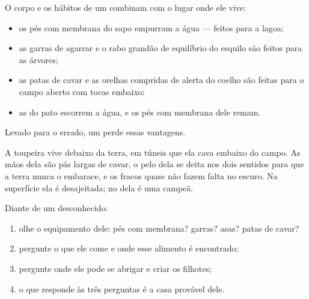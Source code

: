 \begin{proposition}\label{prop:g2:where-animals-live:fit}
O corpo e os hábitos de um  combinam com o lugar onde ele vive:
\begin{itemize}
  \item os pés com membrana do sapo empurram a água --- feitos para
        a lagoa;
  \item as garras de agarrar e o rabo grandão de equilíbrio do
        esquilo são feitos para as árvores;
  \item as patas de cavar e as orelhas compridas de alerta do
        coelho são feitas para o campo aberto com tocas embaixo;
  \item as  do pato escorrem a água, e os pés com membrana dele
        remam.
\end{itemize}
Levado para o  errado, um  perde essas vantagens.
\end{proposition}
\admitted

\begin{example}\label{ex:g2:where-animals-live:mole}
A toupeira vive debaixo da terra, em túneis que ela cava embaixo do
campo. As mãos dela são pás largas de cavar, o pelo dela se deita
nos dois sentidos para que a terra nunca o embarace, e os 
fracos quase não fazem falta no escuro. Na superfície ela é
desajeitada; no  dela é uma campeã.
\end{example}

\begin{method}\label{met:g2:where-animals-live:matching}
Diante de um  desconhecido:
\begin{enumerate}
  \item olhe o equipamento dele: pés com membrana? garras? asas?
        patas de cavar?
  \item pergunte o que ele come e onde esse alimento é encontrado;
  \item pergunte onde ele pode se abrigar e criar os filhotes;
  \item o  que responde às três perguntas é a casa provável
        dele.
\end{enumerate}
\end{method}

